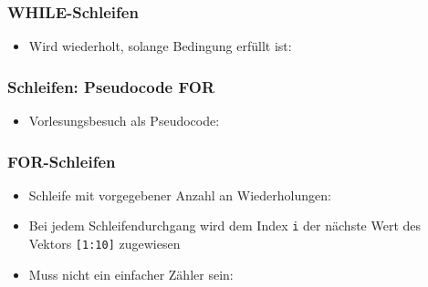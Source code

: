       \begin{frame}
          \frametitle{WHILE-Schleifen}
          \begin{itemize}
            \item Wird wiederholt, solange Bedingung erfüllt ist:
            
          \end{itemize}
      \end{frame}

	  \begin{frame}
          \frametitle{Schleifen: Pseudocode FOR}
           \begin{itemize}
             \item Vorlesungsbesuch als Pseudocode:
             
          \end{itemize}
      \end{frame}


      \begin{frame}
          \frametitle{FOR-Schleifen}
          \begin{itemize}
            \item Schleife mit vorgegebener Anzahl an Wiederholungen:
            
            \item Bei jedem Schleifendurchgang wird dem Index \texttt{i} der nächste Wert des Vektors \texttt{[1:10]} zugewiesen
            \item Muss nicht  ein einfacher Zähler sein:
            
          \end{itemize}
      \end{frame}

